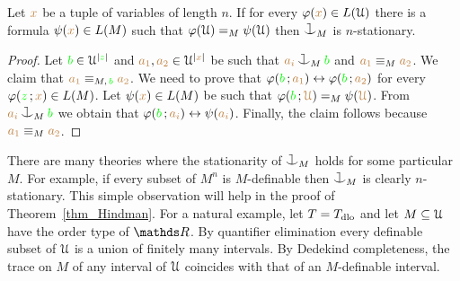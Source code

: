 \documentclass[creche.tex]{subfiles}
\begin{document}
\begin{proposition}
Let ${\color{brown} x}$ be a tuple of variables of length $n$.
If for every $\varphi({\color{brown} x})\in L(\EuScript U)$ there is a formula $\psi({\color{brown} x})\in L(M)$ such that $\varphi(\EuScript U)=_M\psi(\EuScript U)$ then $\cnonfork_M$ is $n$-stationary.
\end{proposition}

\begin{proof}
Let  ${\color{green} b}\in\EuScript U^{|{\color{green} z}|}$ and ${\color{brown} a_1},{\color{brown} a_2}\in\EuScript U^{|{\color{brown} x}|}$ 
be such that ${\mr a_i}\cnonfork_M{\gr b}$ and ${\color{brown} a_1}\equiv_M{\color{brown} a_2}$.
We claim that ${\color{brown} a_1}\equiv_{M,\,{\color{green} b}}{\color{brown} a_2}$.
We need to prove that $\varphi({\color{green} b}\,;{\color{brown} a_1})\leftrightarrow\varphi({\color{green} b}\,;{\color{brown} a_2})$ 
for every  $\varphi({\color{green} z}\,;{\color{brown} x})\in L(M)$.
Let $\psi({\color{brown} x})\in L(M)$ be such that $\varphi({\color{green} b}\,;{\color{brown} \EuScript U})=_M\psi({\color{brown} \EuScript U})$.
From ${\mr a_i}\cnonfork_M{\gr b}$ we obtain that  $\varphi({\color{green} b}\,;{\color{brown} a_i})\leftrightarrow\psi({\color{brown} a_i})$.
Finally, the claim follows because ${\color{brown} a_1}\equiv_M{\color{brown} a_2}$.
\end{proof}



% 


\begin{remark}\label{rk_coheir_stationary}
There are many theories where the stationarity of $\cnonfork_M$ holds for some particular $M$.
For example, if every subset of $M^n$ is $M$-definable then $\cnonfork_M$ is clearly $n$-stationary.
This simple observation will help in the proof of Theorem~\ref{thm_Hindman}.
For a natural example, let $T=T_{\rm dlo}$ and let $M\subseteq\EuScript U$ have the order type of $\RR$.
By quantifier elimination every definable subset of $\EuScript U$ is a union of finitely many intervals.
By Dedekind completeness, the trace on $M$ of any interval of $\EuScript U$ coincides with that of an $M$-definable interval. 
\end{remark}
\end{document}
